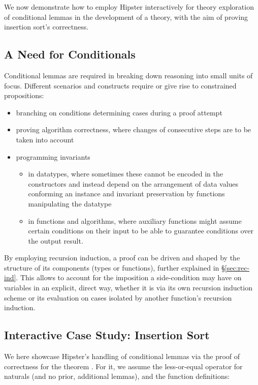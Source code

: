 \label{sec:conditionals}

We now demonstrate how to employ Hipster interactively for theory exploration of conditional lemmas in the development of a theory, with the aim of proving insertion sort's correctness.

\subsection{A Need for Conditionals}

Conditional lemmas are required in breaking down reasoning into small units of focus.
%
Different scenarios and constructs require or give rise to constrained propositions:

\begin{itemize}\itemsep0mm
\item branching on conditions determining cases during a proof attempt
\item proving algorithm correctness, where changes of consecutive steps are to be taken into account
\item programming invariants
\begin{itemize}\itemsep1mm
\item in datatypes, where sometimes these cannot be encoded in the constructors and instead depend on the arrangement of data values conforming an instance and invariant preservation by functions manipulating the datatype
\item in functions and algorithms, where auxiliary functions might assume certain conditions on their input to be able to guarantee conditions over the output result.
\end{itemize}
\end{itemize}

By employing recursion induction, a proof can be driven and shaped by the structure of its components (types or functions), further explained in \S \ref{sec:rec-ind}.
%
This allows to account for the imposition a side-condition may have on variables in an explicit, direct way, whether it is via its own recursion induction scheme or its evaluation on cases isolated by another function's recursion induction.


\subsection{Interactive Case Study: Insertion Sort}

We here showcase Hipster's handling of conditional lemmas via the proof of correctness for the theorem .
%
For it, we assume the less-or-equal operator \isaCode{$\le$} for naturals (and no prior, additional lemmas), and the function definitions:

